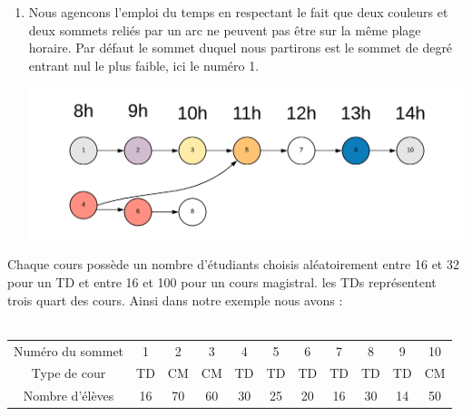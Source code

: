 \documentclass[a4paper,11pt]{article}
\begin{document}
\begin{enumerate}
			\item Nous agencons l'emploi du temps en respectant le fait que deux couleurs et deux sommets reliés par un arc ne peuvent pas être sur la même plage horaire. Par défaut le sommet duquel nous partirons est le sommet de degré entrant nul le plus faible, ici le numéro 1.
			\centerline{\includegraphics[scale=0.8]{Captures/exemple4.png}}
		\end{enumerate}
		Chaque cours possède un nombre d'étudiants choisis aléatoirement entre 16 et 32 pour un TD et entre 16 et 100 pour un cours magistral. les TDs représentent trois quart des cours. Ainsi dans notre exemple nous avons : \\
		\\
		\begin{tabular}{ | c | c | c | c | c | c | c | c | c | c | c |}
 			\hline			
   			Numéro du sommet & 1 & 2 & 3 & 4 & 5 & 6 & 7 & 8 & 9 & 10\\
   			Type de cour & TD & CM & CM & TD & TD & TD & TD & TD & TD & CM \\
   			Nombre d'élèves & 16 & 70 & 60 & 30 & 25 & 20 & 16 & 30 & 14 & 50\\
 			\hline  
 		\end{tabular}\\
\end{document}
